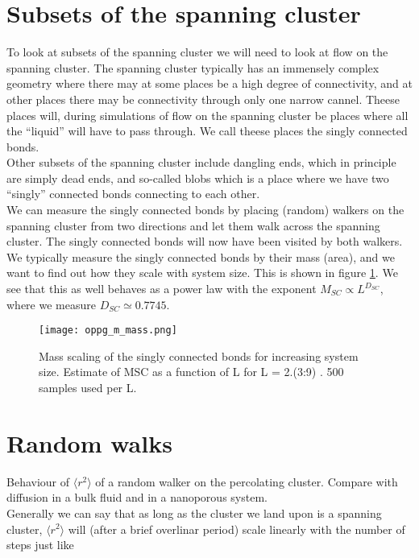 \documentclass[a4paper,english, 10pt, twoside]{article}
\begin{document}
\section{Subsets of the spanning cluster}
To look at subsets of the spanning cluster we will need to look at flow on the spanning cluster. The spanning cluster typically has 
an immensely complex geometry where there may at some places be a high degree of connectivity, and at other places there may be 
connectivity through only one narrow cannel. Theese places will, during simulations of flow on the spanning cluster be places where 
all the ``liquid'' will have to pass through. We call theese places the singly connected bonds.\\
Other subsets of the spanning cluster include dangling ends, which in principle are simply dead ends, and so-called blobs which is a 
place where we have two ``singly'' connected bonds connecting to each other.\\
We can measure the singly connected bonds by placing (random) walkers on the spanning cluster from two directions and let them walk 
across the spanning cluster. The singly connected bonds will now have been visited by both walkers. We typically measure the 
singly connected bonds by their mass (area), and we want to find out how they scale with system size. This is shown in figure 
\ref{singly_connected}. We see that this as well behaves as a power law with the exponent $M_{SC} \propto L^{D_{SC}}$, where we measure 
$D_{SC} \simeq 0.7745$.

\begin{figure}[H]
\centering
\texttt{[image: oppg\_m\_mass.png]}
\caption{Mass scaling of the singly connected bonds for increasing system size. Estimate of MSC as a function of L for L = 2.(3:9) . 500 samples used per L.
}
\label{singly_connected}
\end{figure}



\section{Random walks}
Behaviour of $\langle r^2\rangle$ of a random walker on the percolating cluster. Compare with diffusion in a bulk fluid and in 
a nanoporous system.\\

Generally we can say that as long as the cluster we land upon is a spanning cluster, $\langle r^2\rangle$ will (after a brief 
overlinar period) scale linearly with the number of steps just like \\
\end{document}
